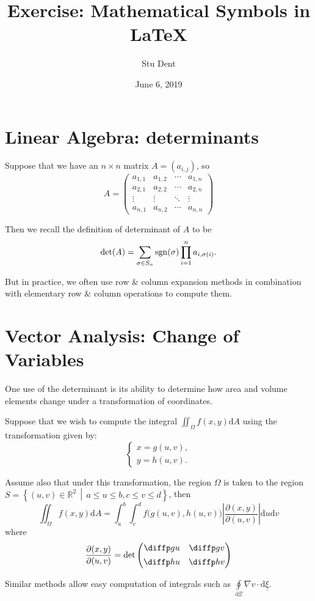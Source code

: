 \documentclass[a4paper,11pt]{article}
\title{Exercise: Mathematical Symbols in \LaTeX}
\author{Stu Dent}
\date{June 6, 2019}
\def\sgn{\mathop{\rm sgn}\nolimits}
\def\d{\mathrm{d}}
\begin{document}
\maketitle

\section{Linear Algebra: determinants\label{sec:linear-algebra-determinants}}

Suppose that we have an $n \times n$ matrix $A = (a_{i,j})$, so
\[
A = \begin{pmatrix}
a_{1,1} & a_{1,2} & \cdots & a_{1,n} \\
a_{2,1} & a_{2,2} & \cdots & a_{2,n} \\
\vdots & \vdots & \ddots & \vdots \\
a_{n,1} & a_{n,2} & \cdots & a_{n,n}
\end{pmatrix}
\]

Then we recall the definition of determinant of $A$ to be
\[
\det(A) = \sum_{\sigma \in S_n} \sgn(\sigma) \prod_{i=1}^n a_{i, \sigma(i)}.
\]

But in practice, we often use row \& column expansion methods in combination with elementary row \& column operations to compute them.

\section{Vector Analysis: Change of Variables\label{sec:vector-analysis-change-of-variables}}

One use of the determinant is its ability to determine how area and volume elements change under a transformation of coordinates.

Suppose that we wish to compute the integral $\iint_\Omega f(x, y) \d A$ using the transformation given by:
\[
\begin{cases}
x = g(u, v), \\
y = h(u, v).
\end{cases}
\]

Assume also that under this transformation, the region $\Omega$ is taken to the region $S = \left\{ (u, v) \in \mathbb{R}^2 \, \middle| \, a \le u \le b, c \le v \le d \right\}$, then
\[
\iint_\Omega f(x, y) \d A = \int_a^b \int_c^d f\Big( g(u,v), h(u,v) \Big) \left| \frac{\partial (x,y)}{\partial (u,v)} \right| \d u \d v
\]
where
\[
\frac{\partial (x,y)}{\partial (u,v)} = \det \begin{pmatrix}
\diffp gu & \diffp gv \\[1ex]
\diffp hu & \diffp hv
\end{pmatrix}
\]

Similar methods allow easy computation of integrals such as $\oint\limits_{\partial \Xi} \nabla v \cdot \d \underline{\xi}$.
\end{document}
